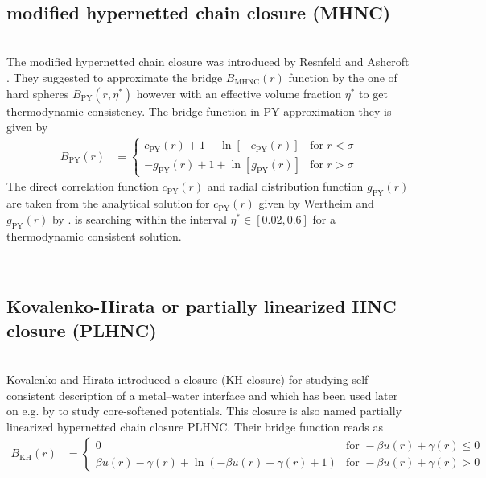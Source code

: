 \vphantom{.}~\\
\subsection{modified hypernetted chain closure (MHNC)}
\label{sec:MHNC}~\\

The modified hypernetted chain closure was introduced by Resnfeld and Ashcroft \cite{Rosenfeld1979}. They suggested to approximate the bridge $B_\mathrm{MHNC}(r)$ function by the one of hard spheres $B_\mathrm{PY}(r,\eta^*)$ however with an effective volume fraction $\eta^*$ to get thermodynamic consistency. The bridge function in PY approximation they is given by
\begin{align}
B_\mathrm{PY}(r) &=
\begin{cases}
c_\mathrm{PY}(r) +1+\ln \left[ -c_\mathrm{PY}(r)\right] &\mbox{for } r<\sigma \\
-g_\mathrm{PY}(r) +1+\ln \left[ g_\mathrm{PY}(r)\right]
&\mbox{for } r>\sigma
\end{cases}
\end{align}
The direct correlation function $c_\mathrm{PY}(r)$ and radial distribution function $g_\mathrm{PY}(r)$ are taken from the analytical solution for $c_\mathrm{PY}(r)$ given by Wertheim \cite{Wertheim1963} and $g_\mathrm{PY}(r)$ by \cite{Trokhymchuk2005,Trokhymchuk2006}.  \SASfit is searching within the interval $\eta^* \in [0.02,0.6]$ for a thermodynamic consistent solution.

\vphantom{.}~\\
\subsection{Kovalenko-Hirata or partially linearized HNC closure (PLHNC)}
\label{sec:PLHNC}~\\

Kovalenko and Hirata \cite{Kovalenko1999} introduced a closure (KH-closure) for studying self-consistent description of a metal–water interface and which has been used later on e.g. by \cite{Hus2013} to study core-softened potentials. This closure is also named partially linearized hypernetted chain closure PLHNC. Their bridge function reads as
\begin{align} \label{eq:ozKH}
B_\text{KH}(r)
&=
\begin{cases}
0  & \mbox{for } -\beta u(r) + \gamma(r) \leq 0  \\
\beta u(r)-\gamma(r)+\ln(-\beta u(r)+\gamma(r)+1)   & \mbox{for } -\beta u(r) + \gamma(r) > 0
\end{cases}
\end{align}

